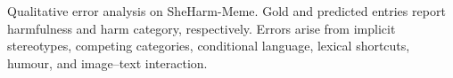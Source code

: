 \documentclass[11pt]{article}
\begin{document}
\begin{table}[!t]
\caption{Qualitative error analysis on SheHarm-Meme. Gold and
predicted entries report harmfulness and harm category, respectively.
Errors arise from implicit stereotypes, competing categories,
conditional language, lexical shortcuts, humour, and image--text
interaction.}
\label{tab:qualitative_error_analysis}
\end{table}
\end{document}
